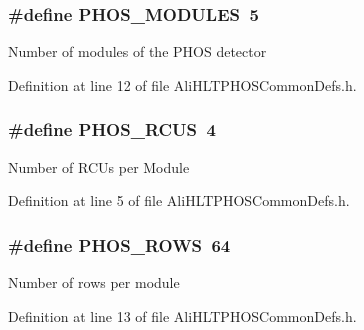 \subsubsection{\setlength{\rightskip}{0pt plus 5cm}\#define PHOS\_\-MODULES\ 5}\label{AliHLTPHOSCommonDefs_8h_a5}


Number of modules of the PHOS detector 

Definition at line 12 of file Ali\-HLTPHOSCommon\-Defs.h.
\subsubsection{\setlength{\rightskip}{0pt plus 5cm}\#define PHOS\_\-RCUS\ 4}\label{AliHLTPHOSCommonDefs_8h_a0}


Number of RCUs per Module 

Definition at line 5 of file Ali\-HLTPHOSCommon\-Defs.h.
\subsubsection{\setlength{\rightskip}{0pt plus 5cm}\#define PHOS\_\-ROWS\ 64}\label{AliHLTPHOSCommonDefs_8h_a6}


Number of rows per module 

Definition at line 13 of file Ali\-HLTPHOSCommon\-Defs.h.